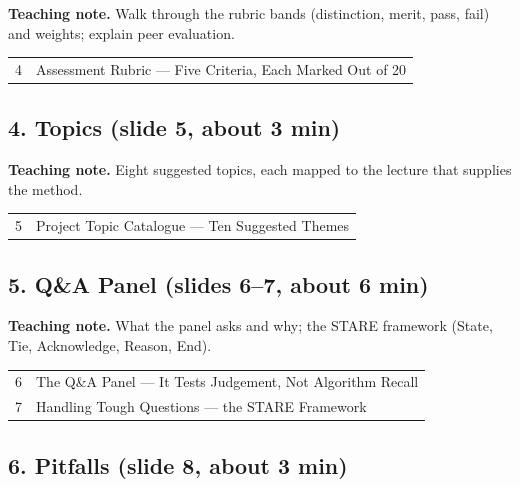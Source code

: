 \documentclass[11pt]{article}
\begin{document}
\textbf{Teaching note.} Walk through the rubric bands (distinction, merit, pass, fail) and weights; explain peer evaluation.

\begin{center}\small\renewcommand{\arraystretch}{1.1}\begin{tabularx}{\textwidth}{@{}r X@{}}4 & Assessment Rubric --- Five Criteria, Each Marked Out of 20\\\end{tabularx}\end{center}

\subsection{4. Topics \normalfont\small\color{GreyN}(slide 5, about 3 min)}

\textbf{Teaching note.} Eight suggested topics, each mapped to the lecture that supplies the method.

\begin{center}\small\renewcommand{\arraystretch}{1.1}\begin{tabularx}{\textwidth}{@{}r X@{}}5 & Project Topic Catalogue --- Ten Suggested Themes\\\end{tabularx}\end{center}

\subsection{5. Q\&A Panel \normalfont\small\color{GreyN}(slides 6--7, about 6 min)}

\textbf{Teaching note.} What the panel asks and why; the STARE framework (State, Tie, Acknowledge, Reason, End).

\begin{center}\small\renewcommand{\arraystretch}{1.1}\begin{tabularx}{\textwidth}{@{}r X@{}}6 & The Q\&A Panel --- It Tests Judgement, Not Algorithm Recall\\
7 & Handling Tough Questions --- the STARE Framework\\\end{tabularx}\end{center}

\subsection{6. Pitfalls \normalfont\small\color{GreyN}(slide 8, about 3 min)}
\end{document}
